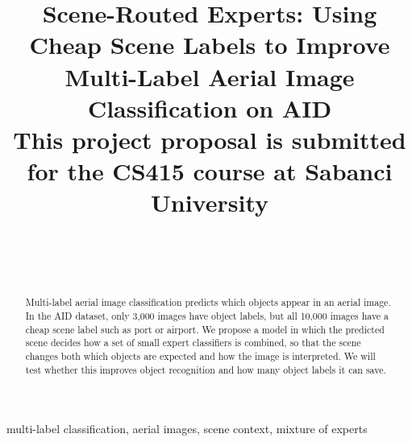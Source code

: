 \documentclass[9pt, conference, a4paper]{IEEEtran}
\begin{document}
\title{Scene-Routed Experts: Using Cheap Scene Labels to Improve Multi-Label Aerial Image Classification on AID\\
{\footnotesize This project proposal is submitted for the CS415 course at Sabanci University}
}

\author{
\\[0.5cm]
\and
{}
\\[0.5cm]
}

\maketitle

\begin{abstract}
Multi-label aerial image classification predicts which objects appear in an aerial image. In the AID dataset, only 3,000 images have object labels, but all 10,000 images have a cheap scene label such as port or airport. We propose a model in which the predicted scene decides how a set of small expert classifiers is combined, so that the scene changes both which objects are expected and how the image is interpreted. We will test whether this improves object recognition and how many object labels it can save.
\end{abstract}

\begin{IEEEkeywords}
multi-label classification, aerial images, scene context, mixture of experts
\end{IEEEkeywords}
\end{document}
